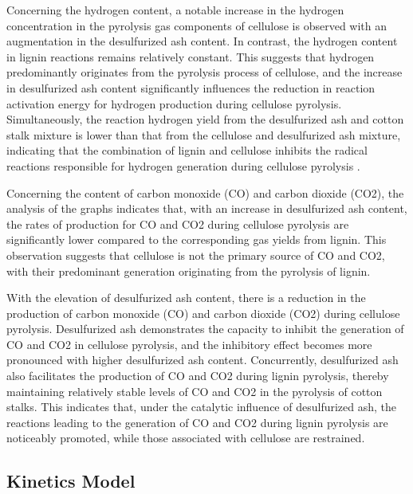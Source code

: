 \documentclass{swmcmthesis}
\begin{document}
Concerning the hydrogen content, a notable increase in the hydrogen concentration in the pyrolysis gas components of cellulose is observed with an augmentation in the desulfurized ash content. In contrast, the hydrogen content in lignin reactions remains relatively constant. This suggests that hydrogen predominantly originates from the pyrolysis process of cellulose, and the increase in desulfurized ash content significantly influences the reduction in reaction activation energy for hydrogen production during cellulose pyrolysis. Simultaneously, the reaction hydrogen yield from the desulfurized ash and cotton stalk mixture is lower than that from the cellulose and desulfurized ash mixture, indicating that the combination of lignin and cellulose inhibits the radical reactions responsible for hydrogen generation during cellulose pyrolysis \cite{bib3}.

Concerning the content of carbon monoxide (CO) and carbon dioxide (CO2), the analysis of the graphs indicates that, with an increase in desulfurized ash content, the rates of production for CO and CO2 during cellulose pyrolysis are significantly lower compared to the corresponding gas yields from lignin. This observation suggests that cellulose is not the primary source of CO and CO2, with their predominant generation originating from the pyrolysis of lignin\cite{bib4}.

With the elevation of desulfurized ash content, there is a reduction in the production of carbon monoxide (CO) and carbon dioxide (CO2) during cellulose pyrolysis. Desulfurized ash demonstrates the capacity to inhibit the generation of CO and CO2 in cellulose pyrolysis, and the inhibitory effect becomes more pronounced with higher desulfurized ash content. Concurrently, desulfurized ash also facilitates the production of CO and CO2 during lignin pyrolysis, thereby maintaining relatively stable levels of CO and CO2 in the pyrolysis of cotton stalks. This indicates that, under the catalytic influence of desulfurized ash, the reactions leading to the generation of CO and CO2 during lignin pyrolysis are noticeably promoted, while those associated with cellulose are restrained.

\subsection{Kinetics Model}
\end{document}
